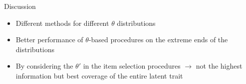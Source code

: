 \documentclass[final,t]{beamer}
\begin{document}
\begin{frame}
\begin{columns}[t]
\begin{column}{.45\linewidth}
				\begin{block}{Discussion}
					\begin{itemize}
						\item Different methods for different $\theta$ distributions
						
						\item  Better performance of $\theta$-based procedures on the extreme ends of the distributions
						
						\item By considering the $\theta'$ in the item selection procedures $\rightarrow$ not the highest information but best coverage of the entire latent trait
					\end{itemize}

				\end{block}
			
	
				
			\end{column}
		\end{columns}
		
		
	\end{frame}
	
\end{document}
